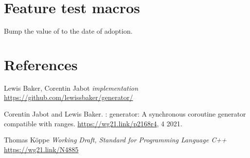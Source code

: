 \documentclass{wg21}
\begin{document}
\section{Feature test macros}

Bump the value of  to the date of adoption.

\section{References}
\renewcommand{\section}[2]{}%



\begin{thebibliography}{9}
    Lewis Baker, Corentin Jabot
    \emph{ implementation}\newline
    \url{https://github.com/lewissbaker/generator/}

    Corentin Jabot and Lewis Baker.
    : generator: A synchronous coroutine generator compatible
    with ranges.
    \newblock \url{https://wg21.link/p2168r4}, 4 2021.

    Thomas Köppe
    \emph{Working Draft, Standard for Programming Language C++}\newline
    \url{https://wg21.link/N4885}


\end{thebibliography}
\end{document}
